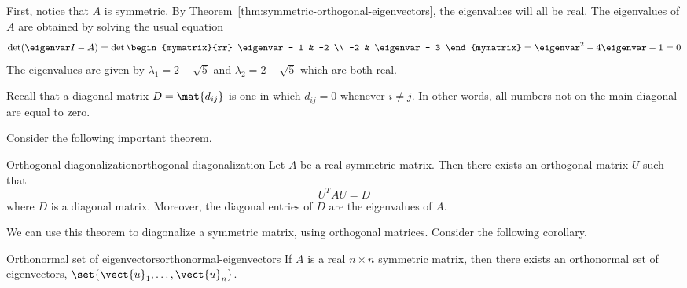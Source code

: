 \begin{solution}
First, notice that $A$ is symmetric. By Theorem~\ref{thm:symmetric-orthogonal-eigenvectors}, the eigenvalues will all be real. The eigenvalues of $A$ are obtained by solving the usual equation
\[
\det (\eigenvar I - A) =
\det \begin{mymatrix}{rr}
\eigenvar - 1 & -2 \\
-2 & \eigenvar - 3
\end{mymatrix} = \eigenvar^2 -4\eigenvar -1=0
\]
The eigenvalues are given by $\lambda_1 =2+
\sqrt{5}$ and $\lambda_2 =2-\sqrt{5}$ which are both real.
\end{solution}

Recall that a diagonal matrix $D=\mat{d_{ij} }$ is one in which $d_{ij} = 0$ whenever $i \neq j$. In other words, all numbers not on the main diagonal are equal to zero.

Consider the following important theorem.

\begin{theorem}{Orthogonal diagonalization}{orthogonal-diagonalization}
Let $A$ be a real symmetric matrix. Then there exists an
orthogonal matrix $U$ such that
\[
U^{T}AU = D
\]
where $D$ is a diagonal matrix. Moreover,
the diagonal entries of $D$ are the eigenvalues of $A$.
\end{theorem}

We can use this theorem to diagonalize a symmetric matrix, using orthogonal matrices. Consider the following corollary.

\begin{corollary}{Orthonormal set of eigenvectors}{orthonormal-eigenvectors}
If $A$ is a real $n\times n$ symmetric matrix, then there exists an
orthonormal set of eigenvectors, $\set{\vect{u}_{1},\ldots,\vect{u}
_{n}}$.
\end{corollary}

